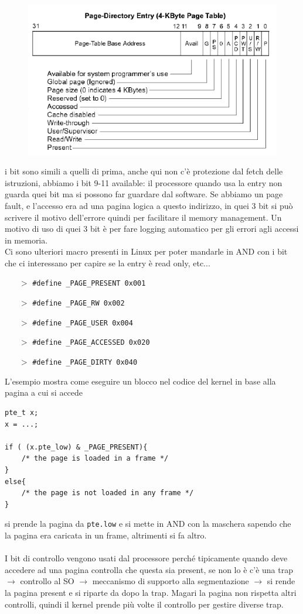 \documentclass[12pt, oneside]{extbook}
\begin{document}
\begin{figure}[!h]
	\includegraphics[scale=0.4]{immagini/i386_pde_entry.png}
\end{figure}
i bit sono simili a quelli di prima, anche qui non c'è protezione dal fetch delle istruzioni, abbiamo i bit 9-11 available: il processore quando usa la entry non guarda quei bit ma si possono far guardare dal software. Se abbiamo un page fault, e l'accesso era ad una pagina logica a questo indirizzo, in quei 3 bit si può scrivere il motivo dell'errore quindi per facilitare il memory management. Un motivo di uso di quei 3 bit è per fare logging automatico per gli errori agli accessi in memoria.\\ Ci sono ulteriori macro presenti in Linux per poter mandarle in AND con i bit che ci interessano per capire se la entry è read only, etc...
\begin{itemize}
	\item[$>$] \texttt{\#define \_PAGE\_PRESENT 0x001}
	\item[$>$] \texttt{\#define \_PAGE\_RW 0x002}
	\item[$>$] \texttt{\#define \_PAGE\_USER 0x004}
	\item[$>$] \texttt{\#define \_PAGE\_ACCESSED 0x020}
	\item[$>$] \texttt{\#define \_PAGE\_DIRTY 0x040}
\end{itemize}
L'esempio mostra come eseguire un blocco nel codice del kernel in base alla pagina a cui si accede
\begin{lstlisting}
pte_t x;
x = ...;

if ( (x.pte_low) & _PAGE_PRESENT){
	/* the page is loaded in a frame */
}
else{
	/* the page is not loaded in any frame */
}
\end{lstlisting}
si prende la pagina da \texttt{pte.low} e si mette in AND con la maschera sapendo che la pagina era caricata in un frame, altrimenti si fa altro.\\\\I bit di controllo vengono usati dal processore perché tipicamente quando deve accedere ad una pagina controlla che questa sia present, se non lo è c'è una trap $\rightarrow$ controllo al SO $\rightarrow$ meccanismo di supporto alla segmentazione $\rightarrow$ si rende la pagina present e si riparte da dopo la trap. Magari la pagina non rispetta altri controlli, quindi il kernel prende più volte il controllo per gestire diverse trap.\\ 
\end{document}
